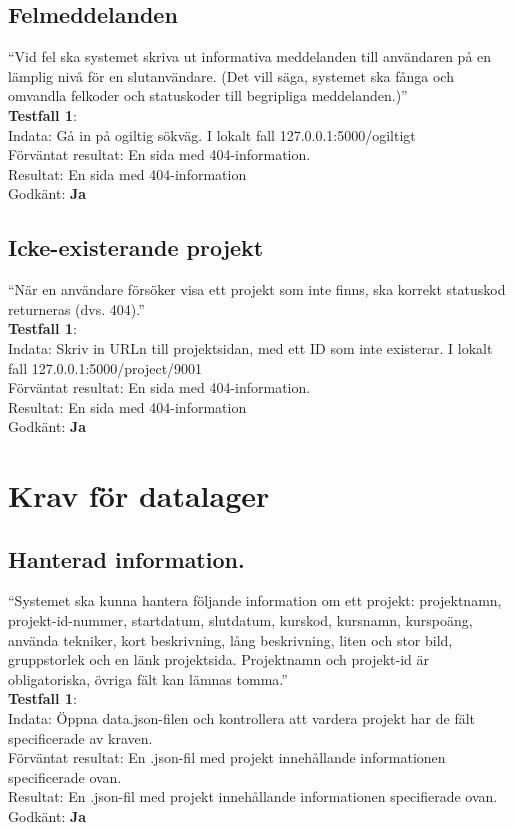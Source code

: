 \documentclass{TDP003mall}
\begin{document}
\subsection{Felmeddelanden}
“Vid fel ska systemet skriva ut informativa meddelanden till användaren
på en lämplig nivå för en slutanvändare. (Det vill säga, systemet ska
fånga och omvandla felkoder och statuskoder till begripliga meddelanden.)”\\
\textbf{Testfall 1}:\\
Indata: Gå in på ogiltig sökväg. I lokalt fall 127.0.0.1:5000/ogiltigt\\
Förväntat resultat: En sida med 404-information.\\
Resultat: En sida med 404-information\\
Godkänt: \textbf{Ja}


\subsection{Icke-existerande projekt}
“När en användare försöker visa ett projekt som inte finns, ska korrekt
statuskod returneras (dvs. 404).”\\
\textbf{Testfall 1}: \\
Indata: Skriv in URLn till projektsidan, med ett ID som inte existerar. I lokalt fall 127.0.0.1:5000/project/9001\\
Förväntat resultat: En sida med 404-information.\\
Resultat: En sida med 404-information\\
Godkänt: \textbf{Ja}


\section{Krav för datalager}
\subsection{Hanterad information.}
“Systemet ska kunna hantera följande information om ett projekt: projektnamn, projekt-id-nummer, startdatum, slutdatum, kurskod, kursnamn, kurspoäng, använda tekniker, kort beskrivning, lång beskrivning, liten och stor bild, gruppstorlek och en länk projektsida. Projektnamn och projekt-id är obligatoriska, övriga fält kan lämnas tomma.”\\
\textbf{Testfall 1}:\\
Indata: Öppna data.json-filen och kontrollera att vardera projekt har de fält specificerade av kraven.\\
Förväntat resultat: En .json-fil med projekt innehållande informationen specificerade ovan.\\
Resultat: En .json-fil med projekt innehållande informationen specifierade ovan.\\
Godkänt: \textbf{Ja}
\end{document}
